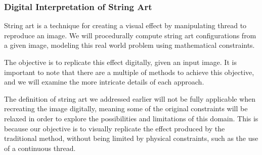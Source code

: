 \subsubsection{Digital Interpretation of String Art}

String art is a technique for creating a visual effect by manipulating thread to reproduce an image. We will procedurally compute string art configurations from a given image, modeling this real world problem using mathematical constraints.

The objective is to replicate this effect digitally, given an input image. It is important to note that there are a multiple of methods to achieve this objective, and we will examine the more intricate details of each approach.

The definition of string art we addressed earlier will not be fully applicable when recreating the image digitally, meaning some of the original constraints will be relaxed in order to explore the possibilities and limitations of this domain. This is because our objective is to visually replicate the effect produced by the traditional method, without being limited by physical constraints, such as the use of a continuous thread.

